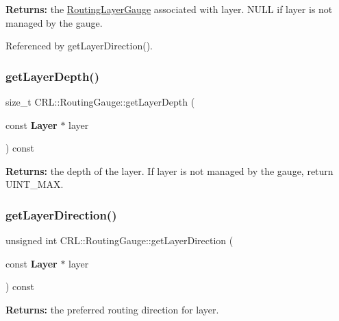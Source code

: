 {\bfseries Returns\+:} the \mbox{\hyperlink{classCRL_1_1RoutingLayerGauge}{Routing\+Layer\+Gauge}} associated with {\ttfamily layer}. N\+U\+LL if {\ttfamily layer} is not managed by the gauge. 

Referenced by get\+Layer\+Direction().

\mbox{\label{classCRL_1_1RoutingGauge_ac429c6ad1b2af7c588c60eff35c2d02e}} 
\subsubsection{\texorpdfstring{get\+Layer\+Depth()}{getLayerDepth()}}
{\footnotesize\ttfamily size\+\_\+t C\+R\+L\+::\+Routing\+Gauge\+::get\+Layer\+Depth (\begin{DoxyParamCaption}\item[{const \textbf{ Layer} $\ast$}]{layer }\end{DoxyParamCaption}) const}

{\bfseries Returns\+:} the depth of the {\ttfamily layer}. If {\ttfamily layer} is not managed by the gauge, return U\+I\+N\+T\+\_\+\+M\+AX. \mbox{\label{classCRL_1_1RoutingGauge_ac553c4dc3f51576a3128ad42d5a006b2}} 
\subsubsection{\texorpdfstring{get\+Layer\+Direction()}{getLayerDirection()}\hspace{0.1cm}{\footnotesize\ttfamily [1/2]}}
{\footnotesize\ttfamily unsigned int C\+R\+L\+::\+Routing\+Gauge\+::get\+Layer\+Direction (\begin{DoxyParamCaption}\item[{const \textbf{ Layer} $\ast$}]{layer }\end{DoxyParamCaption}) const}

{\bfseries Returns\+:} the preferred routing direction for {\ttfamily layer}. \mbox{\label{classCRL_1_1RoutingGauge_a1b6d28bbee28db727ffe13e6205dbae8}} 
